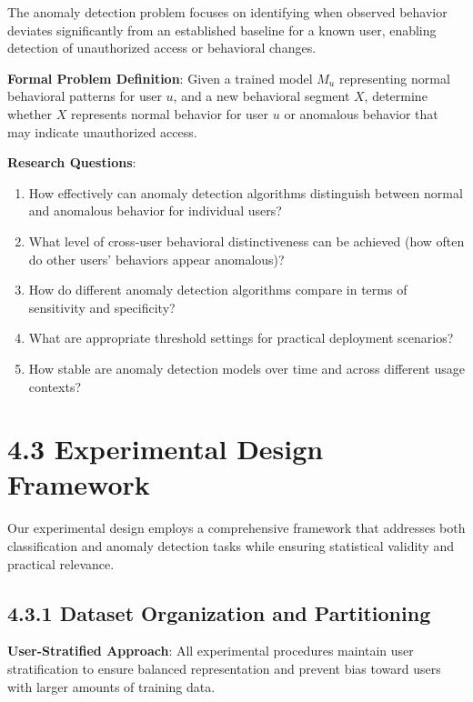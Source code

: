 \documentclass[
  12pt,
  a4paper,
]{report}
\providecommand{\tightlist}{%
  \setlength{\itemsep}{0pt}\setlength{\parskip}{0pt}}
\begin{document}
The anomaly detection problem focuses on identifying when observed
behavior deviates significantly from an established baseline for a known
user, enabling detection of unauthorized access or behavioral changes.

\textbf{Formal Problem Definition}: Given a trained model \(M_u\)
representing normal behavioral patterns for user \(u\), and a new
behavioral segment \(X\), determine whether \(X\) represents normal
behavior for user \(u\) or anomalous behavior that may indicate
unauthorized access.

\textbf{Research Questions}:

\begin{enumerate}
\def\labelenumi{\arabic{enumi}.}
\tightlist
\item
  How effectively can anomaly detection algorithms distinguish between
  normal and anomalous behavior for individual users?
\item
  What level of cross-user behavioral distinctiveness can be achieved
  (how often do other users' behaviors appear anomalous)?
\item
  How do different anomaly detection algorithms compare in terms of
  sensitivity and specificity?
\item
  What are appropriate threshold settings for practical deployment
  scenarios?
\item
  How stable are anomaly detection models over time and across different
  usage contexts?
\end{enumerate}

\section{4.3 Experimental Design
Framework}\label{experimental-design-framework}

Our experimental design employs a comprehensive framework that addresses
both classification and anomaly detection tasks while ensuring
statistical validity and practical relevance.

\subsection{4.3.1 Dataset Organization and
Partitioning}\label{dataset-organization-and-partitioning}

\textbf{User-Stratified Approach}: All experimental procedures maintain
user stratification to ensure balanced representation and prevent bias
toward users with larger amounts of training data.
\end{document}
